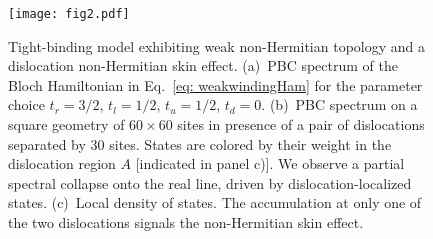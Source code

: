 \documentclass[aps,prl,twocolumn,amsmath,amssymb,floatfix,superscriptaddress]{revtex4-2}
\begin{document}
\begin{figure}[t]
\centering
\texttt{[image: fig2.pdf]}
\caption{Tight-binding model exhibiting weak non-Hermitian topology and a dislocation non-Hermitian skin effect. (a)~PBC spectrum of the Bloch Hamiltonian in Eq.~\eqref{eq: weakwindingHam} for the parameter choice $t_r = 3/2$, $t_l = 1/2$, $t_u = 1/2$, $t_d = 0$. (b)~PBC spectrum on a square geometry of $60 \times 60$ sites in presence of a pair of dislocations separated by $30$ sites. States are colored by their weight in the dislocation region $A$ [indicated in panel c)]. We observe a partial spectral collapse onto the real line, driven by dislocation-localized states. (c)~Local density of states. The accumulation at only one of the two dislocations signals the non-Hermitian skin effect.}
\label{fig: weaknumerics}
\end{figure}
\end{document}
